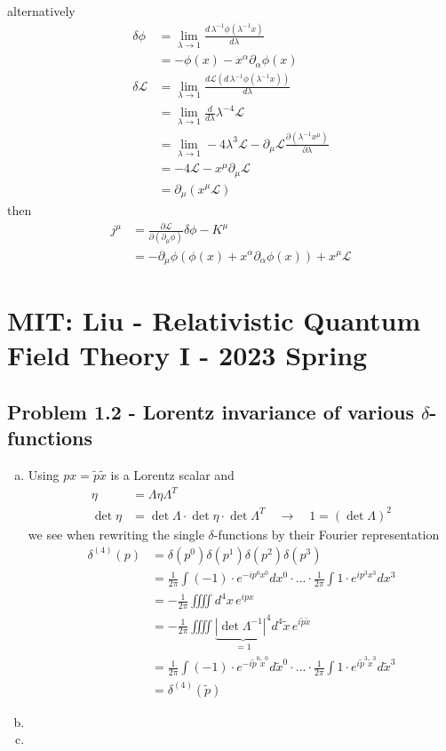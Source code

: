 \documentclass[../main.tex]{subfiles}
\begin{document}
alternatively
\begin{align}
\delta\phi&=\lim_{\lambda\rightarrow1}\frac{d\, \lambda^{-1}\phi(\lambda^{-1}x)}{d\lambda}\\
&=-\phi(x)-x^\alpha\partial_\alpha\phi(x)\\
\delta\mathcal{L}
&=\lim_{\lambda\rightarrow1}\frac{d\mathcal{L}(d\, \lambda^{-1}\phi(\lambda^{-1}x))}{d\lambda}\\
&=\lim_{\lambda\rightarrow1}\frac{d}{d\lambda}\lambda^{-4}\mathcal{L}\\
&=\lim_{\lambda\rightarrow1}-4\lambda^3\mathcal{L}-\partial_\mu\mathcal{L}\frac{\partial(\lambda^{-1}x^\mu)}{\partial\lambda}\\
&=-4\mathcal{L}-x^\mu\partial_\mu\mathcal{L}\\
&=\partial_\mu(x^\mu\mathcal{L})
\end{align}
then
\begin{align}
j^\mu&=\frac{\partial\mathcal{L}}{\partial(\partial_\mu\phi)}\delta\phi-K^\mu\\
&=-\partial_\mu\phi (\phi(x)+x^\alpha\partial_\alpha\phi(x))+x^\mu\mathcal{L}
\end{align}


\newpage
\section{MIT: {\sc Liu} - Relativistic Quantum Field Theory I - 2023 Spring}

\subsection{Problem 1.2 - Lorentz invariance of various $\delta$-functions}
\begin{enumerate}[(a)]
\item Using $px=\tilde{p}\tilde{x}$ is a Lorentz scalar and 
\begin{align}
\eta
&=\Lambda\eta\Lambda^T\\
\det\eta
&=\det\Lambda\cdot\det\eta\cdot\det\Lambda^T\quad
\rightarrow\quad 1=(\det\Lambda)^2
\end{align}
we see when rewriting the single $\delta$-functions by their Fourier representation
\begin{align}
\delta^{(4)}(p)
&=\delta(p^0)\delta(p^1)\delta(p^2)\delta(p^3)\\
&=\frac{1}{2\pi}\int (-1)\cdot e^{-ip^0x^0}dx^0\cdot ...\cdot\frac{1}{2\pi}\int 1\cdot e^{ip^3x^3}dx^3\\
&=-\frac{1}{2\pi}\iiiint d^4x\, e^{ipx}\\
&=-\frac{1}{2\pi}\iiiint \underbrace{|\det\Lambda^{-1}|^4}_{=1}d^4\tilde{x}\, e^{i\tilde{p}\tilde{x}}\\
&=\frac{1}{2\pi}\int (-1)\cdot e^{-i\tilde{p}^0\tilde{x}^0}d\tilde{x}^0\cdot ...\cdot\frac{1}{2\pi}\int 1\cdot e^{i\tilde{p}^3\tilde{x}^3}d\tilde{x}^3\\
&=\delta^{(4)}(\tilde{p})
\end{align}

\item 
\item 

\end{enumerate}
\end{document}
